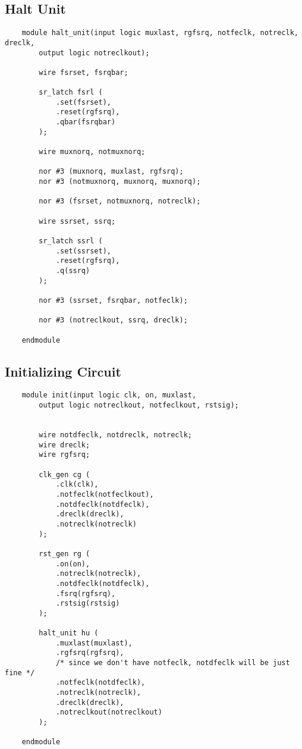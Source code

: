 \documentclass[../main]{subfiles}
\begin{document}
\subsection {Halt Unit}

\begin{verbatim}
    module halt_unit(input logic muxlast, rgfsrq, notfeclk, notreclk, dreclk,
        output logic notreclkout);

        wire fsrset, fsrqbar;

        sr_latch fsrl (
            .set(fsrset),
            .reset(rgfsrq),
            .qbar(fsrqbar)
        );

        wire muxnorq, notmuxnorq;

        nor #3 (muxnorq, muxlast, rgfsrq);
        nor #3 (notmuxnorq, muxnorq, muxnorq);

        nor #3 (fsrset, notmuxnorq, notreclk);

        wire ssrset, ssrq;

        sr_latch ssrl (
            .set(ssrset),
            .reset(rgfsrq),
            .q(ssrq)
        );

        nor #3 (ssrset, fsrqbar, notfeclk);

        nor #3 (notreclkout, ssrq, dreclk);

    endmodule
\end{verbatim}

\subsection {Initializing Circuit}

\begin{verbatim}
    module init(input logic clk, on, muxlast,
        output logic notreclkout, notfeclkout, rstsig);


        wire notdfeclk, notdreclk, notreclk;
        wire dreclk;
        wire rgfsrq;

        clk_gen cg (
            .clk(clk),
            .notfeclk(notfeclkout),
            .notdfeclk(notdfeclk),
            .dreclk(dreclk),
            .notreclk(notreclk)
        );

        rst_gen rg (
            .on(on),
            .notreclk(notreclk),
            .notdfeclk(notdfeclk),
            .fsrq(rgfsrq),
            .rstsig(rstsig)
        );

        halt_unit hu (
            .muxlast(muxlast),
            .rgfsrq(rgfsrq),
            /* since we don't have notfeclk, notdfeclk will be just fine */
            .notfeclk(notdfeclk),
            .notreclk(notreclk),
            .dreclk(dreclk),
            .notreclkout(notreclkout)
        );

    endmodule
\end{verbatim}
\end{document}

